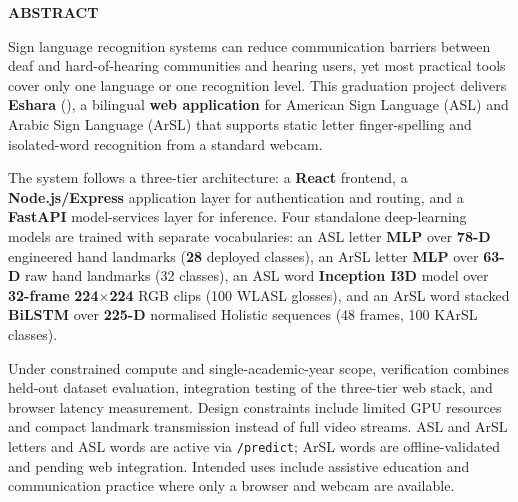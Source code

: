 \newpage
\thispagestyle{plain} 

\begin{center}
    \Large \textbf{ABSTRACT}
\end{center}
\vspace{0.8cm}

\normalsize

\noindent Sign language recognition systems can reduce communication barriers between deaf and hard-of-hearing communities and hearing users, yet most practical tools cover only one language or one recognition level. This graduation project delivers \textbf{Eshara} (), a bilingual \textbf{web application} for American Sign Language (ASL) and Arabic Sign Language (ArSL) that supports static letter finger-spelling and isolated-word recognition from a standard webcam.\par\vspace{0.45cm}

\noindent The system follows a three-tier architecture: a \textbf{React} frontend, a \textbf{Node.js/Express} application layer for authentication and routing, and a \textbf{FastAPI} model-services layer for inference. Four standalone deep-learning models are trained with separate vocabularies: an ASL letter \textbf{MLP} over \textbf{78-D} engineered hand landmarks (\textbf{28} deployed classes), an ArSL letter \textbf{MLP} over \textbf{63-D} raw hand landmarks (32 classes), an ASL word \textbf{Inception I3D} model over \textbf{32-frame} \textbf{224$\times$224} RGB clips (100 WLASL glosses), and an ArSL word stacked \textbf{BiLSTM} over \textbf{225-D} normalised Holistic sequences (48 frames, 100 KArSL classes).\par\vspace{0.45cm}

\noindent Under constrained compute and single-academic-year scope, verification combines held-out dataset evaluation, integration testing of the three-tier web stack, and browser latency measurement. Design constraints include limited GPU resources and compact landmark transmission instead of full video streams. ASL and ArSL letters and ASL words are active via \texttt{/predict}; ArSL words are offline-validated and pending web integration. Intended uses include assistive education and communication practice where only a browser and webcam are available.\par
